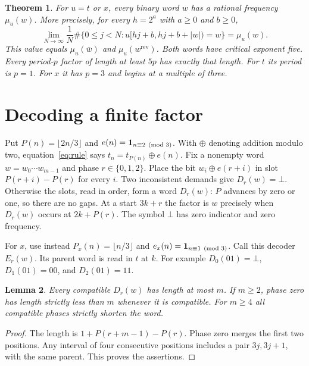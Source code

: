 \documentclass[11pt]{article}
\newtheorem{theorem}{Theorem}
\newtheorem{lemma}[theorem]{Lemma}
\newcommand{\rev}{\mathrm{rev}}
\begin{document}
\begin{theorem}\label{main}
For $u=t$ or $x$, every binary word $w$ has a rational frequency $\mu_u(w)$. More precisely,
for every $h=2^a$ with $a\ge0$ and $b\ge0$,
\[
 \lim_{N\to\infty}\frac1N\#\{0\le j<N:u[hj+b,hj+b+|w|)=w\}=\mu_u(w).
\]
This value equals $\mu_u(\bar w)$ and $\mu_u(w^{\rev})$. Both words have critical exponent
five. Every period-$p$ factor of length at least $5p$ has exactly that length. For $t$ its
period is $p=1$. For $x$ it has $p=3$ and begins at a multiple of three.
\end{theorem}

\section{Decoding a finite factor}
Put $P(n)=\lfloor2n/3\rfloor$ and $e(n)={\bf1}_{n\equiv2\pmod3}$. With $\oplus$ denoting
addition modulo two, equation~\eqref{eq:rule} says $t_n=t_{P(n)}\oplus e(n)$. Fix a
nonempty word $w=w_0\cdots w_{m-1}$ and phase $r\in\{0,1,2\}$. Place the bit
$w_i\oplus e(r+i)$ in slot $P(r+i)-P(r)$ for every $i$. Two inconsistent demands give
$D_r(w)=\bot$. Otherwise the slots, read in order, form a word $D_r(w)$: $P$ advances by
zero or one, so there are no gaps. At a start $3k+r$ the factor is $w$ precisely when
$D_r(w)$ occurs at $2k+P(r)$. The symbol $\bot$ has zero indicator and zero frequency.

For $x$, use instead $P_x(n)=\lfloor n/3\rfloor$ and $e_x(n)={\bf1}_{n\equiv1\pmod3}$.
Call this decoder $E_r(w)$. Its parent word is read in $t$ at $k$.
For example $D_0(01)=\bot$, $D_1(01)=00$, and $D_2(01)=11$.

\begin{lemma}\label{length}
Every compatible $D_r(w)$ has length at most $m$. If $m\ge2$, phase zero has length
strictly less than $m$ whenever it is compatible. For $m\ge4$ all compatible phases
strictly shorten the word.
\end{lemma}
\begin{proof}
The length is $1+P(r+m-1)-P(r)$. Phase zero merges the first two positions.
Any interval of four consecutive positions includes a pair $3j,3j+1$, with the
same parent. This proves the assertions.
\end{proof}
\end{document}
